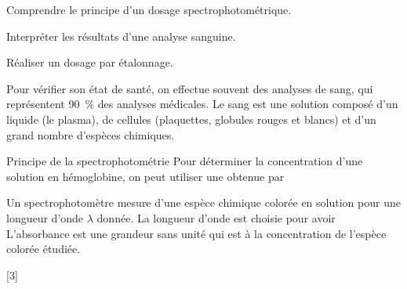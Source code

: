 \teteTermStssDosa
\vspace*{-30pt}

\begin{objectifs}
  \item Comprendre le principe d'un dosage spectrophotométrique.
  \item Interpréter les résultats d'une analyse sanguine.
  \item Réaliser un dosage par étalonnage.
\end{objectifs}

\begin{contexte}
  Pour vérifier son état de santé, on effectue souvent des analyses de sang, qui représentent \qty{90}{\percent} des analyses médicales.  
  Le sang est une solution composé d'un liquide (le plasma), de cellules (plaquettes, globules rouges et blancs) et d'un grand nombre d'espèces chimiques.
  
\end{contexte}

\begin{doc}{Principe de la spectrophotométrie}
  Pour déterminer la concentration d'une solution en hémoglobine, on peut utiliser une  obtenue par 

  Un spectrophotomètre mesure  d'une espèce chimique colorée en solution pour une longueur d'onde $\lambda$ donnée.
  La longueur d'onde est choisie pour avoir 
  L'absorbance est une grandeur sans unité qui est  à la concentration de l'espèce colorée étudiée.
\end{doc}

[3]

